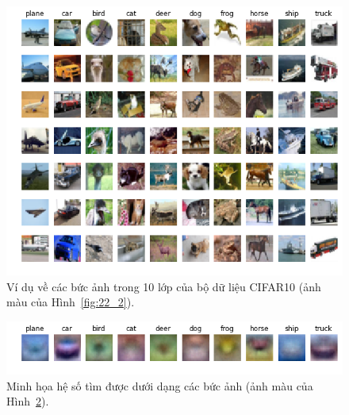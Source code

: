 

\begin{figure}[t]
\centering
\includegraphics[width = \textwidth]{Chapters/09_SupportVectorMachines/22_multiclasssvm/cifar.png}
\caption[]{Ví dụ về các bức ảnh trong 10 lớp của bộ dữ liệu CIFAR10 (ảnh màu của Hình~\ref{fig:22_2}).}
\label{fig:22_2_c}
\end{figure}


\begin{figure}[]
\centering
\includegraphics[width = \textwidth]{Chapters/09_SupportVectorMachines/22_multiclasssvm/learned_ws_2.png}
\caption[]{ Minh họa hệ số tìm được dưới dạng các bức ảnh (ảnh màu của Hình~\ref{fig:22_9_c}).}
\label{fig:22_9_c}
\end{figure}
